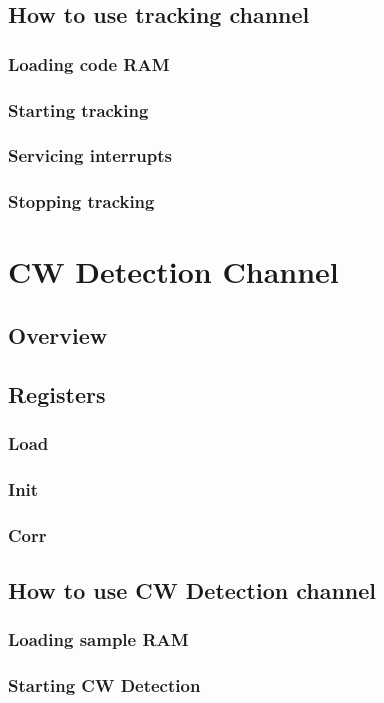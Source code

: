 \documentclass{article}
\begin{document}
\begin{multicols}{2}
\subsection{How to use tracking channel}
\subsubsection{Loading code RAM}
\subsubsection{Starting tracking}
\subsubsection{Servicing interrupts}
\subsubsection{Stopping tracking}

\hypertarget{cwlink}{}
\section{CW Detection Channel}
\subsection{Overview}
\subsection{Registers}
\subsubsection{Load}
\subsubsection{Init}
\subsubsection{Corr}
\subsection{How to use CW Detection channel}
\subsubsection{Loading sample RAM}
\subsubsection{Starting CW Detection}

\end{multicols}
\end{document}
